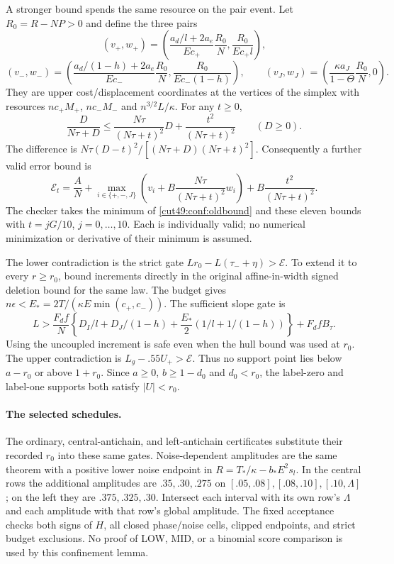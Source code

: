 \documentclass[11pt,a4paper]{article}
\numberwithin{equation}{section}
\theoremstyle{definition}
\theoremstyle{remark}
\begin{document}
A stronger bound spends the same resource on the pair event. Let
$R_0=R-NP>0$ and define the three pairs
\[
 (v_+,w_+)=\left(\frac{a_d/l+2a_e}{Ec_+}\frac{R_0}{N},
                    \frac{R_0}{Ec_+l}\right),
\]
\[
 (v_-,w_-)=\left(\frac{a_d/(1-h)+2a_e}{Ec_-}\frac{R_0}{N},
                    \frac{R_0}{Ec_-(1-h)}\right),\qquad
 (v_J,w_J)=\left(\frac{\kappa a_J}{1-\Theta}\frac{R_0}{N},0\right).
\]
They are upper cost/displacement coordinates at the vertices of the
simplex with resources $nc_+M_+$, $nc_-M_-$ and $n^{3/2}L/\kappa$.
For any $t\ge0$,
\[
 \frac{D}{N\tau+D}\le\frac{N\tau}{(N\tau+t)^2}D+
 \frac{t^2}{(N\tau+t)^2}\qquad(D\ge0).
\]
The difference is $N\tau(D-t)^2/[(N\tau+D)(N\tau+t)^2]$.
Consequently a further valid error bound is
\[
 \mathcal E_t=\frac AN+
 \max_{i\in\{+,-,J\}}\left(v_i+B\frac{N\tau}{(N\tau+t)^2}w_i\right)
 +B\frac{t^2}{(N\tau+t)^2}.
\]
The checker takes the minimum of \eqref{cut49:conf:oldbound} and these eleven
bounds with $t=jG/10$, $j=0,\ldots,10$. Each is individually valid;
no numerical minimization or derivative of their minimum is assumed.

The lower contradiction is the strict gate
$Lr_0-L(\tau_-+\eta)>\mathcal E$.
To extend it to every $r\ge r_0$, bound increments directly in the original
affine-in-width signed deletion bound for the same law. The budget gives
$n\epsilon<E_*=2T/(\kappa E\min(c_+,c_-))$. The sufficient slope gate is
\[
 L>\frac{F_df}{N}\left\{D_I/l+D_J/(1-h)
 +\frac{E_*}{2}\left(1/l+1/(1-h)\right)\right\}+F_dfB_\tau.
\]
Using the uncoupled increment is safe even when the hull bound was used
at $r_0$. The upper contradiction is $L_g-.55U_+>\mathcal E$.
Thus no support point lies below $a-r_0$ or above $1+r_0$.
Since $a\ge0$, $b\ge1-d_0$ and $d_0<r_0$, the label-zero and label-one
supports both satisfy $|U|<r_0$.

\paragraph{The selected schedules.}
The ordinary, central-antichain, and left-antichain certificates substitute
their recorded $r_0$ into these same gates. Noise-dependent amplitudes
are the same theorem with a positive lower noise endpoint in
$R=T_*/\kappa-b_*E^2s_l$. In the central rows the additional amplitudes
are $.35,.30,.275$ on $[.05,.08],[.08,.10],[.10,\Lambda]$;
on the left they are $.375,.325,.30$. Intersect each interval with its
own row's $\Lambda$ and each amplitude with that row's global amplitude.
The fixed acceptance checks both signs of $H$, all closed phase/noise
cells, clipped endpoints, and strict budget exclusions. No proof of
LOW, MID, or a binomial score comparison is used by this confinement lemma.
\end{document}
